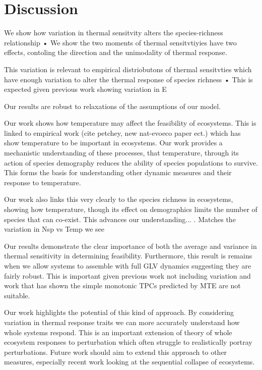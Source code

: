 \documentclass{article}
\begin{document}
\section{Discussion}

We show how variation in thermal sensitvity alters the species-richness relationship
    • We show the two moments of thermal sensitvtiyies have two effects, contoling the direction and the unimodality of thermal response. 
    
This variation is relevant to empirical distriobutons of thermal sensitvties which have enough variation to alter the thermal response of species richness
    • This is expected given previous work showing variation in E
    
Our results are robust to relaxations of the assumptions of our model. 



Our work shows how temperature may affect the feasibility of ecosystems. This is linked to empirical work (cite petchey, new nat-evoeco paper ect.) which has show temperature to be important in  ecosystems. Our work provides a mechanistic understanding of these processes, that temperature, through its action of species demography reduces the ability of species populations to survive. This forms the basis for understanding other dynamic measures and their response to temperature.  

Our work also links this very clearly to the species richness in ecosystems, showing how temperature, though its effect on demographics limits the number of species that can co-exist. This advances our understanding... . Matches the variation in Nsp vs Temp we see 

Our results demonstrate the clear importance of both the average and variance in thermal sensitivity in determining feasibility. Furthermore, this result is remains when we allow systems to assemble with full GLV dynamics suggesting they are fairly robust. This is important given previous work not including variation and work that has shown the simple monotonic TPCs predicted by MTE are not suitable.

Our work highlights the potential of this kind of approach. By considering variation in thermal response traits we can more accurately understand how whole systems respond. This is an important extension of theory of whole ecosystem responses to perturbation which often struggle to realistically portray perturbations. Future work should aim to extend this approach to other measures, especially recent work looking at the sequential collapse of ecosystems. 
\end{document}
